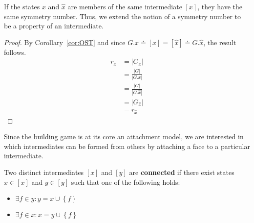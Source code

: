 \begin{mythm}
If the states $x$ and $\hat{x}$ are members of the same intermediate $\left[x\right]$, they have the same symmetry number. Thus, we extend the notion of a symmetry number to be a property of an intermediate.
\end{mythm}
\begin{proof}
By Corollary~\ref{cor:OST} and since $G.x \doteq [x] = [\hat{x}] \doteq G.\hat{x}$, the result follows.
\begin{align}
  r_x &= |G_x| \\
  &= \frac{|G|}{|G.x|} \\
  &= \frac{|G|}{|G.\hat{x}|} \\
  &= |G_{\hat{x}}| \\
  &= r_{\hat{x}}
\end{align}
\end{proof}




Since the building game is at its core an attachment model, we are interested in which intermediates can be formed from others by attaching a face to a particular intermediate.
\begin{mydef}
Two distinct intermediates $\left[x\right]$ and $\left[y\right]$ are \textbf{connected} if there exist states $x \in \left[x\right]$ and $y \in \left[y\right]$ such that one of the following holds:
\begin{itemize}
\item $\exists f \in y: y = x \cup \left\{f\right\}$
  \item $\exists f \in x: x = y \cup \left\{f\right\}$
\end{itemize}
\end{mydef}

